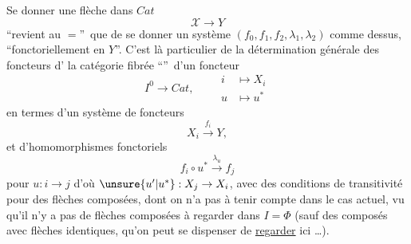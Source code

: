 Se donner une flèche dans $\mathit{Cat}$
\[
\mathscr X\longrightarrow Y
\]
\textquotedblleft revient au $=$\textquotedblright\ que de se donner un système $(f_0,f_1,f_2,\lambda_1,\lambda_2)$ comme dessus,  \textquotedblleft fonctoriellement en $Y$\textquotedblright. C'est là   particulier de la détermination générale des foncteurs d' la catégorie fibrée \textquotedblleft {}\textquotedblright\ d'un  foncteur
\[
I^0\longrightarrow\mathit{Cat},\qquad
\begin{aligned}i&\longmapsto X_i\\u&\longmapsto u^*\end{aligned}
\]
 en termes d'un système de foncteurs
\[
X_i\xrightarrow{f_i}Y ,
\]
et d'homomorphismes fonctoriels
\[
f_i\circ u^*\xrightarrow{\lambda_u} f_j
\]
pour $u:i\to j$ d'où $\unsure{u'|u^*}:X_j\to X_i$, avec des conditions de transitivité pour des flèches composées, dont on n'a pas à tenir compte dans le cas actuel, vu qu'il n'y a pas de flèches composées à regarder dans \deleted{$\unsure{\Phi}$} $I=\Phi$ (sauf des composés  avec flèches identiques,  qu'on peut se dispenser de \uline{regarder} ici \ldots).
